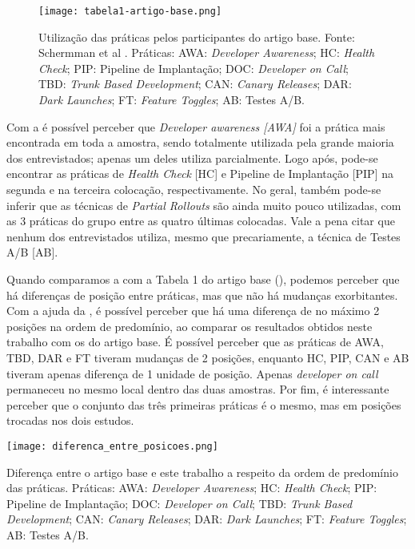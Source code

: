 \begin{figure}[ht]
\begin{center}
\texttt{[image: tabela1-artigo-base.png]}
\end{center}
\caption[Tabela 1 do artigo base]{
    Utilização das práticas pelos participantes do artigo base.
    Fonte: Schermman et al \cite{empiricalStudy2016}. Práticas: AWA: \emph{Developer Awareness}; HC: \emph{Health Check}; PIP: Pipeline de Implantação; DOC: \emph{Developer on Call}; TBD: \emph{Trunk Based Development}; CAN: \emph{Canary Releases}; DAR: \emph{Dark Launches}; FT: \emph{Feature Toggles}; AB: Testes A/B.
}\label{tabela_1_artigo_base}
\end{figure}

Com a  é possível perceber que \emph{Developer awareness [AWA]} foi a prática mais encontrada em toda a amostra, sendo totalmente utilizada pela grande maioria dos entrevistados; apenas um deles utiliza parcialmente. Logo após, pode-se encontrar as práticas de \emph{Health Check} [HC] e Pipeline de Implantação [PIP] na segunda e na terceira colocação, respectivamente. No geral, também pode-se inferir que as técnicas de \emph{Partial Rollouts} são ainda muito pouco utilizadas, com as 3 práticas do grupo entre as quatro últimas colocadas. Vale a pena citar que nenhum dos entrevistados utiliza, mesmo que precariamente, a técnica de Testes A/B [AB].

Quando comparamos a  com a Tabela 1 do artigo base (), podemos perceber que há diferenças de posição entre práticas, mas que não há mudanças exorbitantes. Com a ajuda da , é possível perceber que há uma diferença de no máximo 2 posições na ordem de predomínio, ao comparar os resultados obtidos neste trabalho com os do artigo base. É possível perceber que as práticas de AWA, TBD, DAR e FT tiveram mudanças de 2 posições, enquanto HC, PIP, CAN e AB tiveram apenas diferença de 1 unidade de posição. Apenas \emph{developer on call} permaneceu no mesmo local dentro das duas amostras. Por fim, é interessante perceber que o conjunto das três primeiras práticas é o mesmo, mas em posições trocadas nos dois estudos.

\begin{table}[ht]
\begin{center}
\texttt{[image: diferenca\_entre\_posicoes.png]}
\end{center}
\caption[Diferença entre a ordem de predomínio das práticas]{
    Diferença entre o artigo base e este trabalho a respeito da ordem de predomínio das práticas. Práticas: AWA: \emph{Developer Awareness}; HC: \emph{Health Check}; PIP: Pipeline de Implantação; DOC: \emph{Developer on Call}; TBD: \emph{Trunk Based Development}; CAN: \emph{Canary Releases}; DAR: \emph{Dark Launches}; FT: \emph{Feature Toggles}; AB: Testes A/B.
}\label{diferenca_entre_posicoes_fig}
\end{table}

